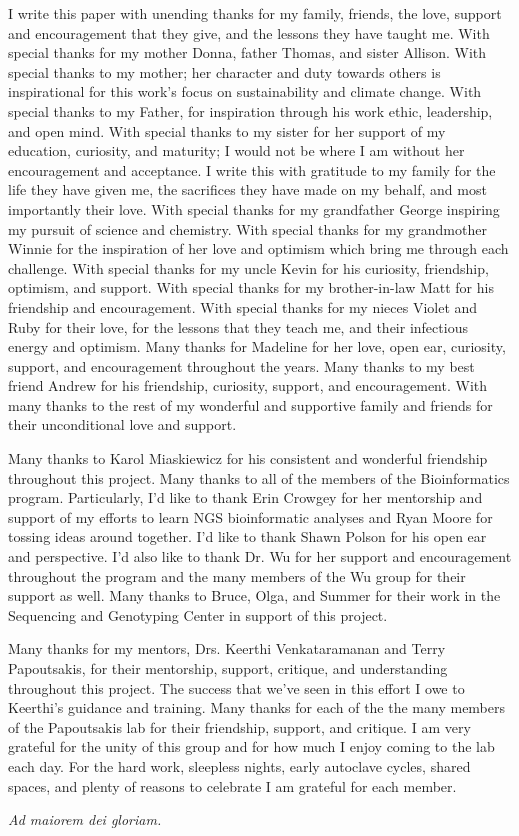 
I write this paper with unending thanks for my family, friends, the love, support and encouragement that they give, and the lessons they have taught me. With special thanks for my mother Donna, father Thomas, and sister Allison. With special thanks to my mother; her character and duty towards others is inspirational for this work's focus on sustainability and climate change. With special thanks to my Father, for inspiration through his work ethic, leadership, and open mind. With special thanks to my sister for her support of my education, curiosity, and maturity; I would not be where I am without her encouragement and acceptance. I write this with gratitude to my family for the life they have given me, the sacrifices they have made on my behalf, and most importantly their love. With special thanks for my grandfather George inspiring my pursuit of science and chemistry. With special thanks for my grandmother Winnie for the inspiration of her love and optimism which bring me through each challenge. With special thanks for my uncle Kevin for his curiosity, friendship, optimism, and support. With special thanks for my brother-in-law Matt for his friendship and encouragement. With special thanks for my nieces Violet and Ruby for their love, for the lessons that they teach me, and their infectious energy and optimism. Many thanks for Madeline for her love, open ear, curiosity, support, and encouragement throughout the years.  Many thanks to my best friend Andrew for his friendship, curiosity, support, and encouragement. With many thanks to the rest of my wonderful and supportive family and friends for their unconditional love and support. 

Many thanks to Karol Miaskiewicz for his consistent and wonderful friendship throughout this project. Many thanks to all of the members of the Bioinformatics program. Particularly, I'd like to thank Erin Crowgey for her mentorship and support of my efforts to learn NGS bioinformatic analyses and Ryan Moore for tossing ideas around together. I'd like to thank Shawn Polson for his open ear and perspective. I'd also like to thank Dr. Wu for her support and encouragement throughout the program and the many members of the Wu group for their support as well. Many thanks to Bruce, Olga, and Summer for their work in the Sequencing and Genotyping Center in support of this project.

Many thanks for my mentors, Drs. Keerthi Venkataramanan and Terry Papoutsakis, for their mentorship, support, critique, and understanding throughout this project. The success that we've seen in this effort I owe to Keerthi's guidance and training. 
Many thanks for each of the the many members of the Papoutsakis lab for their friendship, support, and critique. I am very grateful for the unity of this group and for how much I enjoy coming to the lab each day. For the hard work, sleepless nights, early autoclave cycles, shared spaces, and plenty of reasons to celebrate I am grateful for each member.

{\centerline {\it Ad maiorem dei gloriam.}}